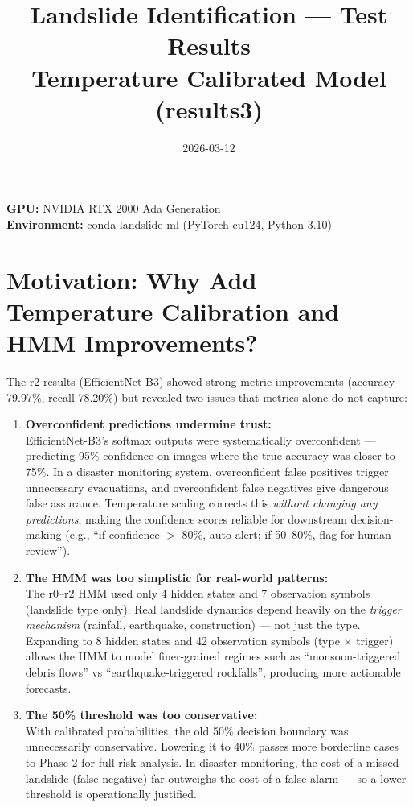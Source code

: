 \documentclass[11pt]{article}
\title{Landslide Identification — Test Results \\ \large Temperature Calibrated Model (results3)}
\author{}
\date{2026-03-12}
\begin{document}
\maketitle

\noindent\textbf{GPU:} NVIDIA RTX 2000 Ada Generation \\
\textbf{Environment:} conda landslide-ml (PyTorch cu124, Python 3.10) \\

\section{Motivation: Why Add Temperature Calibration and HMM Improvements?}

The r2 results (EfficientNet-B3) showed strong metric improvements (accuracy 79.97\%, recall 78.20\%) but revealed two issues that metrics alone do not capture:

\begin{enumerate}
    \item \textbf{Overconfident predictions undermine trust:}\\
          EfficientNet-B3's softmax outputs were systematically overconfident --- predicting 95\% confidence on images where the true accuracy was closer to 75\%. In a disaster monitoring system, overconfident false positives trigger unnecessary evacuations, and overconfident false negatives give dangerous false assurance. Temperature scaling corrects this \textit{without changing any predictions}, making the confidence scores reliable for downstream decision-making (e.g., ``if confidence $>$ 80\%, auto-alert; if 50--80\%, flag for human review'').

    \item \textbf{The HMM was too simplistic for real-world patterns:}\\
          The r0--r2 HMM used only 4 hidden states and 7 observation symbols (landslide type only). Real landslide dynamics depend heavily on the \textit{trigger mechanism} (rainfall, earthquake, construction) --- not just the type. Expanding to 8 hidden states and 42 observation symbols (type $\times$ trigger) allows the HMM to model finer-grained regimes such as ``monsoon-triggered debris flows'' vs ``earthquake-triggered rockfalls'', producing more actionable forecasts.

    \item \textbf{The 50\% threshold was too conservative:}\\
          With calibrated probabilities, the old 50\% decision boundary was unnecessarily conservative. Lowering it to 40\% passes more borderline cases to Phase 2 for full risk analysis. In disaster monitoring, the cost of a missed landslide (false negative) far outweighs the cost of a false alarm --- so a lower threshold is operationally justified.
\end{enumerate}
\end{document}
